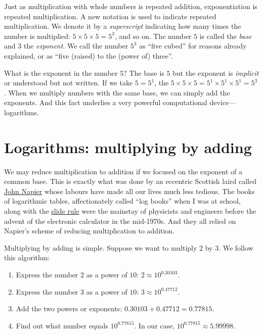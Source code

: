 \documentclass[
  a4paper,
]{article}
\begin{document}
Just as multiplication with whole numbers is repeated addition,
exponentiation is repeated multiplication. A new notation is used to
indicate repeated multiplication. We denote it by a \emph{superscript}
indicating how many times the number is multiplied:
\(5 \times 5 \times 5 = 5^{3}\), and so on. The number \(5\) is called
the \emph{base} and \(3\) the \emph{exponent}. We call the number
\(5^{3}\) as ``five cubed'' for reasons already explained, or as ``five
(raised) to the (power of) three''.

What is the exponent in the number \(5?\) The base is \(5\) but the
exponent is \emph{implicit} or understood but not written. If we take
\(5 = 5^{1}\), the
\(5 \times 5 \times 5 = 5^{1} \times 5^{1} \times 5^{1} = 5^{3}\). When
we multiply numbers with the same base, we can simply add the exponents.
And this fact underlies a very powerful computational
device---logarithms.

\hypertarget{logarithms-multiplying-by-adding}{%
\section{Logarithms: multiplying by
adding}\label{logarithms-multiplying-by-adding}}

We may reduce multiplication to addition if we focused on the exponent
of a common base. This is exactly what was done by an eccentric Scottish
laird called
\href{http://www-history.mcs.st-andrews.ac.uk/Biographies/Napier.html}{John
Napier} whose labours have made all our lives much less tedious. The
books of logarithmic tables, affectionately called ``log books'' when I
was at school, along with the \href{http://sliderulemuseum.com/}{slide
rule} were the mainstay of physicists and engineers before the advent of
the electronic calculator in the mid-1970s. And they all relied on
Napier's scheme of reducing multiplication to addition.

Multiplying by adding is simple. Suppose we want to multiply \(2\) by
\(3\). We follow this algorithm:

\begin{enumerate}
\item
  Express the number \(2\) as a power of \(10\):
  \(2 \approx 10^{0.30103}\).
\item
  Express the number \(3\) as a power of \(10\):
  \(3 \approx 10^{0.47712}\).
\item
  Add the two powers or exponents: \(0.30103 + 0.47712 = 0.77815\).
\item
  Find out what number equals \(10^{0.77815}\). In our case,
  \(10^{0.77815} \approx 5.99998\).
\end{enumerate}
\end{document}
